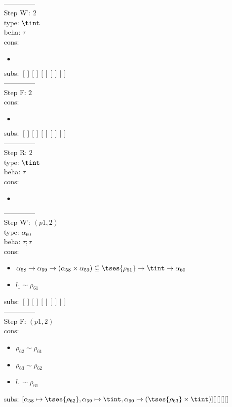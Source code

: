 \documentclass[12pt]{article}
\begin{document}
\\ --------------\\
Step W': $ 2 $\\
  type: $ \tint $ 
\\  beha: $ \tau $ 
\\  cons: \begin{itemize}
\item $  $
\end{itemize} 
  subs:  $ [ ] [] [] [] [] $  
 \\--------------\\ 
Step F: $ 2 $
 \\ cons: \begin{itemize}
\item $  $
\end{itemize}
 subs:  $ [ ] [] [] [] [] $ 
  \\--------------\\ 
Step R: $ 2 $\\
  type: $ \tint $ 
\\  beha: $ \tau $ 
\\  cons: \begin{itemize}
\item $  $
\end{itemize} 
  --------------\\ 
Step W': $ (p1, 2) $\\
  type: $ \alpha_{60} $ 
\\  beha: $ \tau; \tau $ 
\\  cons: \begin{itemize}
\item $ \alpha_{58} \rightarrow \alpha_{59} \rightarrow (\alpha_{58} \times \alpha_{59}) \subseteq  \tses{ \rho_{61}} \rightarrow \tint \rightarrow \alpha_{60} $
\item $ l_{1} \sim\rho_{61} $
\end{itemize} 
  subs:  $ [ ] [] [] [] [] $  
 \\--------------\\ 
Step F: $ (p1, 2) $
 \\ cons: \begin{itemize}
\item $ \rho_{62} \sim\rho_{61} $
\item $ \rho_{63} \sim\rho_{62} $
\item $ l_{1} \sim\rho_{61} $
\end{itemize}
 subs:  $ [ \alpha_{58}\mapsto \tses{ \rho_{62}}, \alpha_{59}\mapsto\tint, \alpha_{60}\mapsto( \tses{ \rho_{63}} \times \tint)] [] [] [] [] $ 
\end{document}

